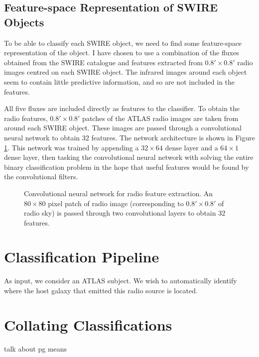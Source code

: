 \documentclass[a4paper]{article}
\newcommand{\fig}{Figure }
\begin{document}
    \subsection{Feature-space Representation of SWIRE Objects}

      To be able to classify each SWIRE object, we need to find some feature-space representation of the object. I have chosen to use a combination of the fluxes obtained from the SWIRE catalogue and features extracted from $0.8' \times 0.8'$ radio images centred on each SWIRE object. The infrared images around each object seem to contain little predictive information, and so are not included in the features.

      All five fluxes are included directly as features to the classifier. To obtain the radio features, $0.8' \times 0.8'$ patches of the ATLAS radio images are taken from around each SWIRE object. These images are passed through a convolutional neural network to obtain 32 features. The network architecture is shown in \fig \ref{fig:cnn}. This network was trained by appending a $32 \times 64$ dense layer and a $64 \times 1$ dense layer, then tasking the convolutional neural network with solving the entire binary classification problem in the hope that useful features would be found by the convolutional filters.

      \begin{figure}
        \centering
        
        \caption{Convolutional neural network for radio feature extraction. An $80 \times 80$ pixel patch of radio image (corresponding to $0.8' \times 0.8'$ of radio sky) is passed through two convolutional layers to obtain 32 features.}
        \label{fig:cnn}
      \end{figure}

  \section{Classification Pipeline}

    As input, we consider an ATLAS subject. We wish to automatically identify where the host galaxy that emitted this radio source is located.



  \section{Collating Classifications}
  \label{sec:consensuses}

    talk about pg means
\end{document}
